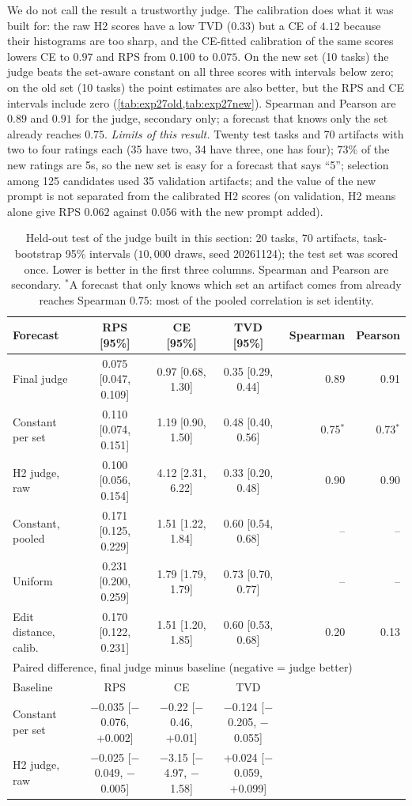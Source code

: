 We do not call the result a trustworthy judge.
The calibration does what it was built for: the raw H2 scores have a low TVD ($0.33$) but a CE of $4.12$ because their histograms are too sharp, and the CE-fitted calibration of the same scores lowers CE to $0.97$ and RPS from $0.100$ to $0.075$.
On the new set (10 tasks) the judge beats the set-aware constant on all three scores with intervals below zero; on the old set (10 tasks) the point estimates are also better, but the RPS and CE intervals include zero (\cref{tab:exp27old,tab:exp27new}).
Spearman and Pearson are $0.89$ and $0.91$ for the judge, secondary only; a forecast that knows only the set already reaches $0.75$.
\emph{Limits of this result.} Twenty test tasks and 70 artifacts with two to four ratings each (35 have two, 34 have three, one has four); $73\%$ of the new ratings are 5s, so the new set is easy for a forecast that says ``5''; selection among 125 candidates used 35 validation artifacts; and the value of the new prompt is not separated from the calibrated H2 scores (on validation, H2 means alone give RPS $0.062$ against $0.056$ with the new prompt added).

\begin{table}[t]
\caption{Held-out test of the judge built in this section: 20 tasks, 70 artifacts, task-bootstrap 95\% intervals ($10{,}000$ draws, seed 20261124); the test set was scored once. Lower is better in the first three columns. Spearman and Pearson are secondary.
$^\ast$A forecast that only knows which set an artifact comes from already reaches Spearman $0.75$: most of the pooled correlation is set identity.}
\label{tab:exp27}
\centering\footnotesize\setlength{\tabcolsep}{3pt}
\begin{tabular}{lcccrr}
\toprule
Forecast & RPS [95\%] & CE [95\%] & TVD [95\%] & Spearman & Pearson\\
\midrule
Final judge & 0.075 [0.047, 0.109] & 0.97 [0.68, 1.30] & 0.35 [0.29, 0.44] & 0.89 & 0.91\\
Constant per set & 0.110 [0.074, 0.151] & 1.19 [0.90, 1.50] & 0.48 [0.40, 0.56] & 0.75$^\ast$ & 0.73$^\ast$\\
H2 judge, raw & 0.100 [0.056, 0.154] & 4.12 [2.31, 6.22] & 0.33 [0.20, 0.48] & 0.90 & 0.90\\
Constant, pooled & 0.171 [0.125, 0.229] & 1.51 [1.22, 1.84] & 0.60 [0.54, 0.68] & -- & --\\
Uniform & 0.231 [0.200, 0.259] & 1.79 [1.79, 1.79] & 0.73 [0.70, 0.77] & -- & --\\
Edit distance, calib. & 0.170 [0.122, 0.231] & 1.51 [1.20, 1.85] & 0.60 [0.53, 0.68] & 0.20 & 0.13\\
\midrule
\multicolumn{6}{l}{Paired difference, final judge minus baseline (negative = judge better)}\\
Baseline & RPS & CE & TVD & & \\
\midrule
Constant per set & $-$0.035 [$-$0.076, +0.002] & $-$0.22 [$-$0.46, +0.01] & $-$0.124 [$-$0.205, $-$0.055] & & \\
H2 judge, raw & $-$0.025 [$-$0.049, $-$0.005] & $-$3.15 [$-$4.97, $-$1.58] & +0.024 [$-$0.059, +0.099] & & \\
\bottomrule
\end{tabular}
\end{table}

